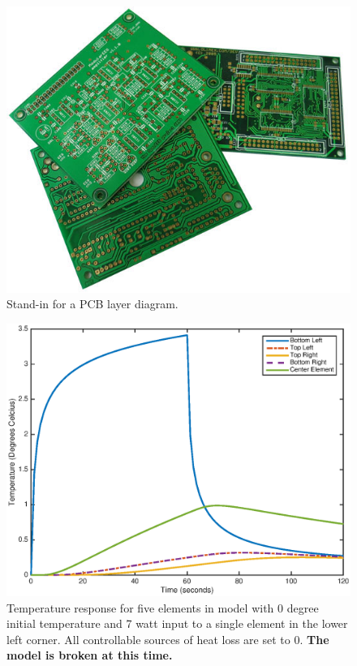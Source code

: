 \documentclass[10pt,twocolumn]{article}
\begin{document}
\begin{figure}
	\center
	\includegraphics[width=0.6\linewidth]{pcb}
	\caption{Stand-in for a PCB layer diagram.}
	\label{fig:pcb}
\end{figure}

\begin{figure}
	\center
	\includegraphics[width=0.8\linewidth]{TempResponse0.eps}
	\caption{Temperature response for five elements in model with 0 degree initial temperature and 7 watt input to a single element in the lower left corner. All controllable sources of heat loss are set to 0. \textbf{The model is broken at this time.}}
	\label{fig:TempResponse0}
\end{figure}
\end{document}
